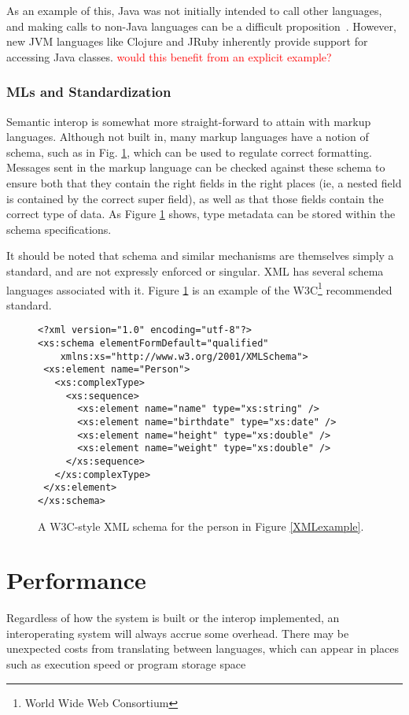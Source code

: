 \documentclass{sig-alternate}
\newcommand{\mycomment}[1]{\textcolor{red}{#1}}
\begin{document}
As an example of this, Java was not initially intended to call other languages, and making calls to non-Java languages can be a difficult proposition~\cite{Chisnall:2013}. However, new JVM languages like Clojure and JRuby inherently provide support for accessing Java classes. \mycomment{would this benefit from an explicit example?}


\subsubsection*{MLs and Standardization}
Semantic interop is somewhat more straight-forward to attain with markup languages. Although not built in, many markup languages have a notion of schema, such as in Fig. \ref{XMLschema}, which can be used to regulate correct formatting. Messages sent in the markup language can be checked against these schema to ensure both that they contain the right fields in the right places (ie, a nested field is contained by the correct super field), as well as that those fields contain the correct type of data. As Figure \ref{XMLschema} shows, type metadata can be stored within the schema specifications.

It should be noted that schema and similar mechanisms are themselves simply a standard, and are not expressly enforced or singular. XML has several schema languages associated with it. Figure \ref{XMLschema} is an example of the W3C\footnote{World Wide Web Consortium} recommended standard.


\begin{figure}
\begin{verbatim}
<?xml version="1.0" encoding="utf-8"?>
<xs:schema elementFormDefault="qualified"
    xmlns:xs="http://www.w3.org/2001/XMLSchema">
 <xs:element name="Person">
   <xs:complexType>
     <xs:sequence>
       <xs:element name="name" type="xs:string" />
       <xs:element name="birthdate" type="xs:date" />
       <xs:element name="height" type="xs:double" />
       <xs:element name="weight" type="xs:double" />
     </xs:sequence>
   </xs:complexType>
 </xs:element>
</xs:schema>
\end{verbatim}
\caption{A W3C-style XML schema for the person in Figure \ref{XMLexample}.}
\label{XMLschema}
\end{figure}



\section{Performance} \label{performance}
Regardless of how the system is built or the interop implemented, an interoperating system will always accrue some overhead. There may be unexpected costs from translating between languages, which can appear in places such as execution speed or program storage space
\end{document}
